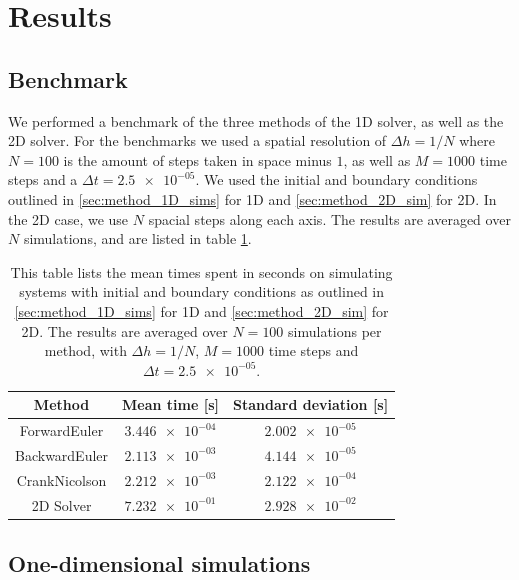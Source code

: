 \documentclass[reprint,english,notitlepage]{revtex4-1}  %
\begin{document}
 
\clearpage

\section{Results} \label{sec:results}

\subsection{Benchmark} \label{sec:results_benchmark}
We performed a benchmark of the three methods of the 1D solver, as well as the 2D solver. For the benchmarks we used a spatial resolution of \(\Delta h = 1/N\) where \(N = 100\) is the amount of steps taken in space minus \(1\), as well as \(M = 1000\) time steps and a \(\Delta t = \num{2.5e-05}\). We used the initial and boundary conditions outlined in \ref{sec:method_1D_sims} for 1D and \ref{sec:method_2D_sim} for 2D. In the 2D case, we use \(N\) spacial steps along each axis. The results are averaged over \(N\) simulations, and are listed in table \ref{table:benchmark}.

\begin{table}[H]
\centering
\caption{This table lists the mean times spent in seconds on simulating systems with initial and boundary conditions as outlined in \ref{sec:method_1D_sims} for 1D and \ref{sec:method_2D_sim} for 2D. The results are averaged over \(N = 100\) simulations per method, with \(\Delta h = 1/N\), \(M = 1000\) time steps and \(\Delta t = \num{2.5e-05}\).} \label{table:benchmark}
\begin{tabular}{|c|c|c|}
\hline
Method & Mean time [s] & Standard deviation [s]\\\hline
ForwardEuler & \(\num{3.446e-04}\) & \(\num{2.002e-05}\) \\
BackwardEuler & \(\num{2.113e-03}\) & \(\num{4.144e-05}\) \\
CrankNicolson & \(\num{2.212e-03}\) & \(\num{2.122e-04}\) \\
2D Solver & \(\num{7.232e-01}\) & \(\num{2.928e-02}\) \\\hline
\end{tabular}
\end{table}

\subsection{One-dimensional simulations} \label{sec:results_1D}
\end{document}
